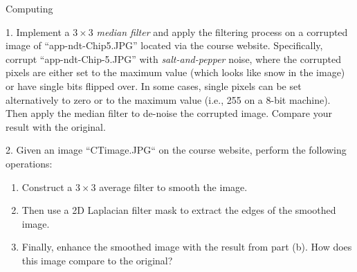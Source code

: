 \begin{section}{Computing}
\begin{homeworkSection}{1. }
Implement a $3 \times 3$ \textit{median filter} and apply the filtering  process on a corrupted image of “app-ndt-Chip5.JPG”
located via the course website. Specifically, corrupt “app-ndt-Chip-5.JPG” with \textit{salt-and-pepper} noise, where the corrupted pixels are either set to the maximum value (which looks like snow in the image) or have single bits flipped over. In some cases, single pixels can be set alternatively to zero or to the maximum value (i.e., 255 on a 8-bit machine). Then apply the median filter to de-noise the corrupted image. Compare your result with the original.
\end{homeworkSection}

\begin{homeworkSection}{2. }
Given an image “CTimage.JPG“ on the course website, perform the following operations:
\renewcommand{\theenumi}{\alph{enumi}}
\begin{enumerate}
	\item Construct a $3 \times 3$ average filter to smooth the image.
	\item Then use a 2D Laplacian filter mask to extract the edges of the smoothed image.
	\item Finally, enhance the smoothed image with the result from part (b). How does this image compare to the original?
\end{enumerate}
\end{homeworkSection}


\end{section}
